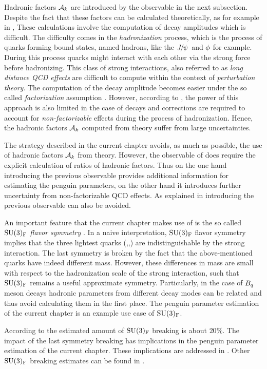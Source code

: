 Hadronic factors $\mathcal{A}_{k}$ are introduced by the observable  in the next
subsection. Despite the fact that these factors can be calculated theoretically, as for example
in \cite{DeBruyn-thesis}, These calculations involve the computation of \BJpsiX decay amplitudes
which is difficult. The difficulty comes in the {\it hadronization} process, which is the process of quarks
forming bound states, named hadrons, like the ${J\mskip -3mu/\mskip -2mu\psi\mskip 2mu}$ and $\phi$ for example.
During this process quarks might interact with each other via the strong force before hadronizing.
This class of strong interactions, also referred to as {\it long distance QCD effects}
are difficult to compute within the context of {\it perturbation theory}.
The computation of the \BJpsiX decay amplitude becomes easier under the so called
{\it factorization} assumption \cite{HAAN1970448,Wirbel1985,CABIBBO1978418,FAKIROV1978315}.
However, according to \cite{DeBruyn-thesis},
the power of this approach is also limited in the case of \BJpsiX decays and corrections
are required to account for {\it non-factorizable} effects during the process of hadronization.
Hence, the hadronic factors $\mathcal{A}_{k}$ computed from theory suffer from large uncertainties.

The strategy described in the current chapter avoids, as much as possible, the use of hadronic
factors $\mathcal{A}_{k}$ from theory. However, the observable of 
does require the explicit calculation of ratios of hadronic factors. Thus on the one hand
introducing the previous observable provides additional information for estimating the penguin
parameters, on the other hand it introduces further uncertainty from non-factorizable QCD effects.
As explained in  introducing the previous observable can also be avoided.

An important feature that the current chapter makes use of is the so called
$\mathrm{SU}(3)_{\rm F}$ {\it flavor symmetry} \cite{GELLMANN1964214,NEEMAN1961222}.
In a naive interpretation, $\mathrm{SU}(3)_{\rm F}$ flavor symmetry implies that the three lightest quarks (\uquark,\dquark,\squark)
are indistinguishable by the strong interaction. The last symmetry is broken by the fact that the above-mentioned
quarks have indeed different mass. However, these differences in mass are small with respect
to the hadronization scale \lqcd of the strong interaction, such that $\mathrm{SU}(3)_{\rm F}$
remains a useful approximate symmetry. Particularly, in the case of $B_q$ meson decays hadronic
parameters from different decay modes can be related and thus avoid calculating them in the first place.
The penguin parameter estimation of the current chapter is an example use case of $\mathrm{SU}(3)_{\rm F}$.

According to \cite{Nagashima:2007qn,Gronau:2013mda} the estimated amount of $\mathrm{SU}(3)_{\rm F}$ breaking is about $20\%$.
The impact of the last symmetry breaking has implications in the penguin parameter estimation
of the current chapter. These implications are addressed in .
Other $\mathrm{SU}(3)_{\rm F}$ breaking estimates can be found in \cite{Charles:2015gya,PDG}.
